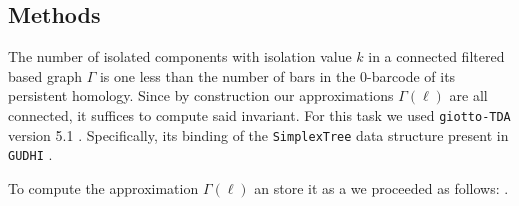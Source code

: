 \subsection{Methods}

The number of isolated components with isolation value $k$ in a connected filtered based graph $\Gamma$ is one less than the number of bars in the 0-barcode of its persistent homology.
Since by construction our approximations $\Gamma(\ell)$ are all connected, it suffices to compute said invariant.
For this task we used \texttt{giotto-TDA} version 5.1 \cite{tauzin2021giotto}.
Specifically, its binding of the \texttt{SimplexTree} data structure \cite{boissonnat2014simplex} present in \texttt{GUDHI} \cite{maria2014gudhi}.

To compute the approximation $\Gamma(\ell)$ an store it as a  we proceeded as follows: .